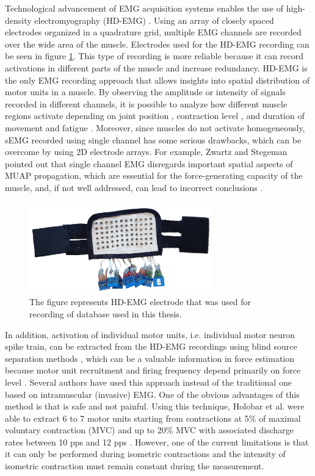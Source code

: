 Technological advancement of EMG acquisition systems enables the use of high-density electromyography (HD-EMG) \citep{Zwarts2004}. Using an array of closely spaced electrodes organized in a quadrature grid, multiple EMG channels are recorded over the wide area of the muscle. Electrodes used for the HD-EMG recording can be seen in figure \ref{fig:electrode}. This type of recording is more reliable because it can record activations in different parts of the muscle and increase redundancy. HD-EMG is the only EMG recording approach that allows insights into spatial distribution of motor units in a muscle. By observing the amplitude or intensity of signals recorded in different channels, it is possible to analyze how different muscle regions activate depending on joint position \citep{Vieira2010}, contraction level \citep{Holtermann2005}, and duration of movement and fatigue \citep{Tucker2009, Staudenmann2014}. Moreover, since muscles do not activate homogeneously, sEMG recorded using single channel has some serious drawbacks, which can be overcome by using 2D electrode arrays. For example, Zwartz and Stegeman pointed out that single channel EMG disregards important spatial aspects of MUAP propagation, which are essential for the force-generating capacity of the muscle, and, if not well addressed, can lead to incorrect conclusions \citep{Zwarts2003}. 
\begin{figure}[ht]
\centering
\includegraphics[width=0.7\textwidth]{Images/introduction/electrode2.png}
\caption{The figure represents HD-EMG electrode that was used for recording of database used in this thesis.}
\label{fig:electrode}
\end{figure}

In addition, activation of individual motor units, i.e. individual motor neuron spike train, can be extracted from the HD-EMG recordings using blind source separation methods \citep{Holobar2007, Holobar2010}, which can be a valuable information in force estimation because motor unit recruitment and firing frequency depend primarily on force level \citep{Merletti-book}. Several authors have used this approach instead of the traditional one based on intramuscular (invasive) EMG. One of the obvious advantages of this method is that is safe and not painful. Using this technique, Holobar et al. were able to extract 6 to 7 motor units starting from contractions at 5\% of maximal voluntary contraction (MVC) and up to 20\% MVC with associated discharge rates between 10 pps and 12 pps \citep{Holobar2010}. However, one of the current limitations is that it can only be performed during isometric contractions and the intensity of isometric contraction must remain constant during the measurement.

